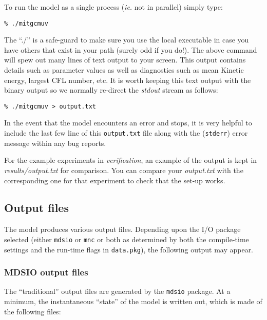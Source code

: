 To run the model as a single process (\textit{ie.} not in parallel)
simply type:
\begin{verbatim}
% ./mitgcmuv
\end{verbatim}
The ``./'' is a safe-guard to make sure you use the local executable
in case you have others that exist in your path (surely odd if you
do!). The above command will spew out many lines of text output to
your screen.  This output contains details such as parameter values as
well as diagnostics such as mean Kinetic energy, largest CFL number,
etc. It is worth keeping this text output with the binary output so we
normally re-direct the {\em stdout} stream as follows:
\begin{verbatim}
% ./mitgcmuv > output.txt
\end{verbatim}
In the event that the model encounters an error and stops, it is very
helpful to include the last few line of this \texttt{output.txt} file
along with the (\texttt{stderr}) error message within any bug reports.

For the example experiments in {\em verification}, an example of the
output is kept in {\em results/output.txt} for comparison. You can
compare your {\em output.txt} with the corresponding one for that
experiment to check that the set-up works.



\subsection{Output files}

The model produces various output files.  Depending upon the I/O
package selected (either \texttt{mdsio} or \texttt{mnc} or both as
determined by both the compile-time settings and the run-time flags in
\texttt{data.pkg}), the following output may appear.


\subsubsection{MDSIO output files}

The ``traditional'' output files are generated by the \texttt{mdsio}
package.  At a minimum, the instantaneous ``state'' of the model is
written out, which is made of the following files:

